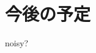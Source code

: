 \documentclass[autodetect-engine,dvipdfmx-if-dvi,ja=standard,a4paper,11pt]{bxjsarticle} %
\begin{document}
\section{今後の予定}
noisy?













\end{document}
